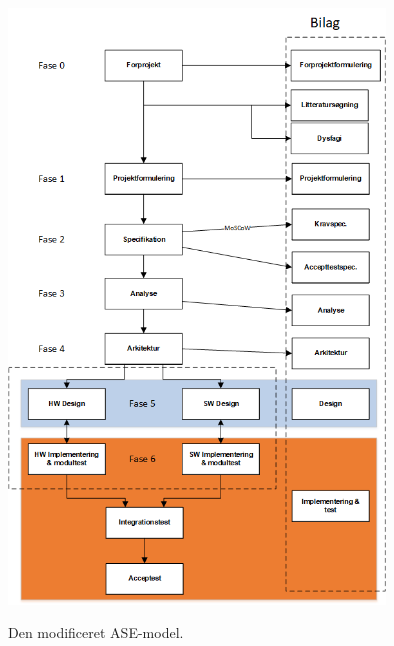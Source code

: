 \begin{figure}[H]
\centering
{\includegraphics[width=10cm]
{Figure/procesVoresASE}}
\caption{Den modificeret ASE-model.}
\label{procesVoresASE}
\end{figure}





%
%
%






